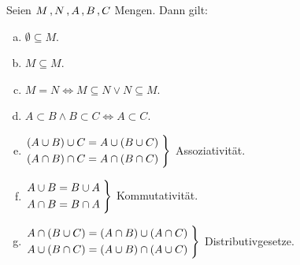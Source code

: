 \documentclass[../ana1.tex]{subfiles}
\begin{document}
\begin{bem} Seien \(M\operatorname{,} N\operatorname{,} A\operatorname{,} B\operatorname{,} C\) Mengen. Dann gilt:
	\begin{enumerate}[(a)]
		\item \(\emptyset \subseteq M\).
		\item \(M \subseteq M\).
		\item \(M = N \iff M \subseteq N \vee N \subseteq M\).
		\item \(A\subset B \wedge B \subset C \iff A \subset C\).
		\item \(\begin{rcases*}
				(A\cup B) \cup C = A \cup (B \cup C)\; \\
				(A\cap B) \cap C = A \cap (B \cap C)\;
			  \end{rcases*}\) Assoziativität.
		\item \(\begin{rcases*}
			    A\cup B = B \cup A\; \\
		        A\cap B = B \cap A\;
			  \end{rcases*}\) Kommutativität.
		\item \(\begin{rcases*}
			    A \cap (B\cup C) = (A\cap B) \cup (A\cap C)\; \\
			    A \cup (B\cap C) = (A\cup B) \cap (A\cup C)\;
			  \end{rcases*}\) Distributivgesetze.
	\end{enumerate}
\end{bem}
\end{document}
